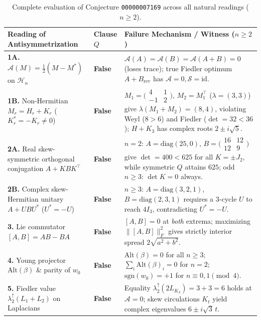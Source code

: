 \documentclass[11pt,a4paper]{article}
\theoremstyle{plain}
\theoremstyle{definition}
\newcommand{\diag}{\mathrm{diag}}
\newcommand{\Herm}{\mathcal{H}}
\newcommand{\Sp}{\mathcal{S}}
\newcommand{\Ap}{\mathcal{A}}
\newcommand{\Alt}{\mathrm{Alt}}
\begin{document}
\begin{table}[ht]
\centering
\small
\renewcommand{\arraystretch}{1.22}
\begin{tabular}{>{\raggedright\arraybackslash}p{} >{\centering\arraybackslash}p{} >{\raggedright\arraybackslash}p{}}
\hline
\textbf{Reading of Antisymmetrization} & \textbf{Clause $Q$} & \textbf{Failure Mechanism / Witness ($n \ge 2$)} \\
\hline
\textbf{1A.} $\Ap(M) = \frac{1}{2}(M - M^*)$ on $\Herm_n$ & \textbf{False} & $\Ap(A) = \Ap(B) = \Ap(A+B) = 0$ (loses trace); true Fiedler optimum $A + B_{\mathrm{rev}}$ has $\Ap = 0, \Sp = \mathrm{id}$. \\
\textbf{1B.} Non-Hermitian $M_r = H_r + K_r$ ($K_r^* = -K_r \ne 0$) & \textbf{False} & $M_1 = \bigl(\begin{smallmatrix}4&1\\-1&2\end{smallmatrix}\bigr)$, $M_2 = M_1^\top$ ($\lambda = (3,3)$) give $\lambda(M_1+M_2) = (8,4)$, violating Weyl ($8 > 6$) and Fiedler ($\det = 32 < 36$); $H + K_3$ has complex roots $2 \pm i\sqrt{5}$. \\
\textbf{2A.} Real skew-symmetric orthogonal conjugation $A + K B K^\top$ & \textbf{False} & $n=2$: $A = \diag(25,0)$, $B = \bigl(\begin{smallmatrix}16&12\\12&9\end{smallmatrix}\bigr)$ give $\det = 400 < 625$ for all $K = \pm J_2$, while symmetric $Q$ attains $625$; odd $n \ge 3$: $\det K = 0$ always. \\
\textbf{2B.} Complex skew-Hermitian unitary $A + U B U^*$ ($U^* = -U$) & \textbf{False} & $n \ge 3$: $A = \diag(3,2,1)$, $B = \diag(2,3,1)$ requires a $3$-cycle $U$ to reach $4 I_3$, contradicting $U^* = -U$. \\
\textbf{3.} Lie commutator $[A, B] = A B - B A$ & \textbf{False} & $[A, B] = 0$ at \emph{both} extrema; maximizing $\|[A, B]\|_F^2$ gives strictly interior spread $2\sqrt{a^2+b^2}$. \\
\textbf{4.} Young projector $\Alt(\beta)$ \& parity of $w_0$ & \textbf{False} & $\Alt(\beta) = 0$ for all $n \ge 3$; $\sum_i \Alt(\beta)_i = 0$ for $n = 2$; $\mathrm{sgn}(w_0) = +1$ for $n \equiv 0, 1 \pmod{4}$. \\
\textbf{5.} Fiedler value $\lambda_2^\uparrow(L_1 + L_2)$ on Laplacians & \textbf{False} & Equality $\lambda_2^\uparrow(2 L_{K_3}) = 3 + 3 = 6$ holds at $\Ap = 0$; skew circulations $K_t$ yield complex eigenvalues $6 \pm i\sqrt{3}\,t$. \\
\hline
\end{tabular}
\caption{Complete evaluation of Conjecture \texttt{00000007169} across all natural readings ($n \ge 2$).}
\label{tab:taxonomy}
\end{table}
\end{document}
